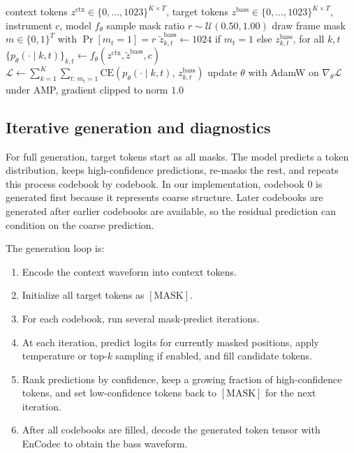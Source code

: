 \documentclass{article}
\begin{document}
\begin{algorithm}[t]
\caption{Masked audio-token training step}
\label{alg:train}
\begin{algorithmic}[1]
\Require context tokens $z^{\mathrm{ctx}}\!\in\!\{0,\ldots,1023\}^{K\times T}$, target tokens $z^{\mathrm{bass}}\!\in\!\{0,\ldots,1023\}^{K\times T}$, instrument $c$, model $f_\theta$
\State sample mask ratio $r \sim \mathcal{U}(0.50, 1.00)$
\State draw frame mask $m \in \{0,1\}^{T}$ with $\Pr[m_t=1]=r$ 
\State $\tilde{z}^{\mathrm{bass}}_{k,t} \gets 1024$ if $m_t=1$ else $z^{\mathrm{bass}}_{k,t}$, for all $k,t$ 
\State $\{p_\theta(\cdot\mid k,t)\}_{k,t} \gets f_\theta(z^{\mathrm{ctx}}, \tilde{z}^{\mathrm{bass}}, c)$
\State $\mathcal{L} \gets \sum_{k=1}^{K}\sum_{t:\,m_t=1} \mathrm{CE}\!\left(p_\theta(\cdot\mid k,t),\, z^{\mathrm{bass}}_{k,t}\right)$ 
\State update $\theta$ with AdamW on $\nabla_\theta \mathcal{L}$ under AMP, gradient clipped to norm $1.0$
\end{algorithmic}
\end{algorithm}

\subsection{Iterative generation and diagnostics}

For full generation, target tokens start as all masks. The model predicts a token distribution, keeps high-confidence predictions, re-masks the rest, and repeats this process codebook by codebook. In our implementation, codebook 0 is generated first because it represents coarse structure. Later codebooks are generated after earlier codebooks are available, so the residual prediction can condition on the coarse prediction.

The generation loop is:
\begin{enumerate}
    \item Encode the context waveform into context tokens.
    \item Initialize all target tokens as $[\mathrm{MASK}]$.
    \item For each codebook, run several mask-predict iterations.
    \item At each iteration, predict logits for currently masked positions, apply temperature or top-$k$ sampling if enabled, and fill candidate tokens.
    \item Rank predictions by confidence, keep a growing fraction of high-confidence tokens, and set low-confidence tokens back to $[\mathrm{MASK}]$ for the next iteration.
    \item After all codebooks are filled, decode the generated token tensor with EnCodec to obtain the bass waveform.
\end{enumerate}
\end{document}
